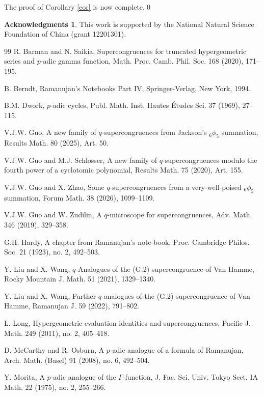 \documentclass[12pt,reqno]{amsart}
\theoremstyle{plain}
\theoremstyle{definition}
\newtheorem*{Acks}{Acknowledgments}
\theoremstyle{remark}
\numberwithin{equation}{section}
\begin{document}
The proof of Corollary \ref{cor} is now complete.\qed

\begin{Acks}
This work is supported by the National Natural Science Foundation of China (grant 12201301).
\end{Acks}

\begin{thebibliography}{99}
 R. Barman and N. Saikia, Supercongruences for truncated hypergeometric series and $p$-adic gamma function, Math. Proc. Camb. Phil. Soc. 168 (2020), 171--195.

 B. Berndt, Ramanujan's Notebooks Part IV, Springer-Verlag, New York, 1994.

 B.M. Dwork, $p$-adic cycles, Publ. Math. Inst. Hautes \'{E}tudes Sci. 37 (1969), 27--115.

 V.J.W. Guo, A new family of $q$-supercongruences from Jackson's ${}_6\phi_5$ summation, Results Math. 80 (2025), Art. 50.

  V.J.W. Guo and M.J. Schlosser, A new family of $q$-supercongruences modulo the fourth power of a cyclotomic polynomial, Results Math. 75 (2020), Art. 155.

 V.J.W. Guo and X. Zhao, Some $q$-supercongruences from a very-well-poised ${}_6\phi_5$ summation, Forum Math. 38 (2026), 1099--1109.

  V.J.W. Guo and W. Zudilin, A $q$-microscope for supercongruences, Adv. Math. 346 (2019), 329--358.

  G.H. Hardy, A chapter from Ramanujan's note-book, Proc. Cambridge Philos.
Soc. 21 (1923), no. 2, 492--503.

 Y. Liu and X. Wang, $q$-Analogues of the (G.2) supercongruence of Van Hamme, Rocky Mountain J. Math. 51 (2021), 1329--1340.

 Y. Liu and X. Wang, Further $q$-analogues of the (G.2) supercongruence of Van Hamme, Ramanujan J. 59 (2022), 791--802.

 L. Long, Hypergeometric evaluation identities and supercongruences, Pacific
J. Math. 249 (2011), no. 2, 405--418.

 D. McCarthy and R. Osburn, A $p$-adic analogue of a formula of Ramanujan, Arch. Math. (Basel) 91 (2008), no. 6, 492--504.

 Y. Morita, A $p$-adic analogue of the $\Gamma$-function, J. Fac. Sci. Univ. Tokyo Sect. IA Math. 22 (1975), no. 2, 255--266.


\end{thebibliography}
\end{document}
